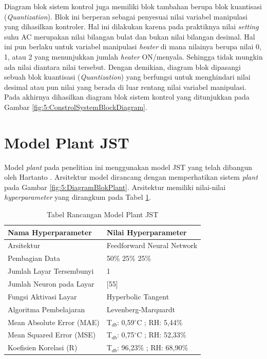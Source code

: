 Diagram blok sistem kontrol juga memiliki blok tambahan berupa blok kuantisasi (\textit{Quantization}). Blok ini berperan sebagai penyesuai nilai variabel manipulasi yang dihasilkan kontroler. Hal ini dilakukan karena pada praktiknya nilai \textit{setting} suhu AC merupakan nilai bilangan bulat dan bukan nilai bilangan desimal. Hal ini pun berlaku untuk variabel manipulasi \textit{heater} di mana nilainya berupa nilai 0, 1, atau 2 yang menunjukkan jumlah \textit{heater} ON/menyala. Sehingga tidak mungkin ada nilai diantara nilai tersebut. Dengan demikian, diagram blok dipasangi sebuah blok kuantisasi (\textit{Quantization}) yang berfungsi untuk menghindari nilai desimal atau pun nilai yang berada di luar rentang nilai variabel manipulasi. Pada akhirnya dihasilkan diagram blok sistem kontrol yang ditunjukkan pada Gambar \ref{fig:5:ConstrolSystemBlockDiagram}.\\
\vspace{1em}

\section{Model Plant JST}

Model \textit{plant} pada penelitian ini menggunakan model JST yang telah dibangun oleh Hartanto \cite{skripsiTanto}. Arsitektur model dirancang dengan memperhatikan sistem \textit{plant} pada Gambar \ref{fig:5:DiagramBlokPlant}. Arsitektur memiliki nilai-nilai \textit{hyperparameter} yang dirangkum pada Tabel \ref{tbl:5:NNPlantTanto}.

\begin{table}[!h]
	\caption{Tabel Rancangan Model Plant JST \cite{skripsiTanto}}
	\label{tbl:5:NNPlantTanto}
	\centering
	\begin{tabular}{|p{5cm}|p{5.2cm}|}
		\hline
		\textbf{Nama Hyperparameter} & \textbf{Nilai Hyperparameter} \\ \hline
		Arsitektur & Feedforward Neural Network \\ \hline
		Pembagian Data & 50\% 25\% 25\% \\ \hline 
		Jumlah Layar Tersembunyi & 1 \\ \hline
		Jumlah Neuron pada Layar & [55] \\ \hline
		Fungsi Aktivasi Layar & Hyperbolic Tangent \\ \hline
		Algoritma Pembelajaran & Levenberg-Marquardt \\ \hline
		Mean Absolute Error (MAE) & T$_{db}$: 0,59$^\circ$C ; RH: 5,44\% \\ \hline
		Mean Squared Error (MSE) & T$_{db}$: 0,75$^\circ$C ; RH: 52,33\% \\ \hline
		Koefisien Korelasi (R) & T$_{db}$: 96,23\% ; RH: 68,90\% \\ \hline
	\end{tabular}
\end{table}

